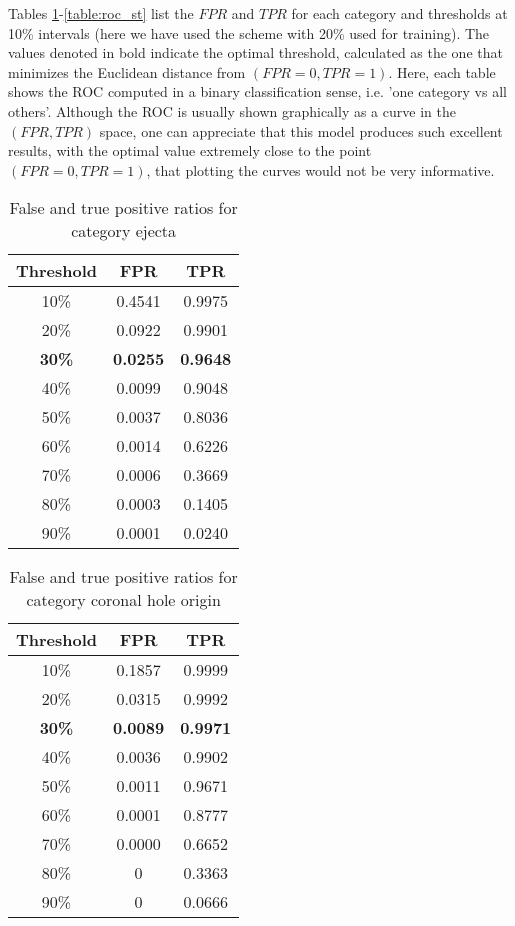 \documentclass[draft,jgrga]{agutex}
\begin{document}
\begin{article}
Tables \ref{table:roc_ejecta}-\ref{table:roc_st} list the $FPR$ and $TPR$ for each category and thresholds at 10\% intervals (here we have used the scheme with 20\% used for training). The values denoted in bold indicate the optimal threshold, calculated as the one that minimizes the Euclidean distance from $(FPR=0, TPR=1)$.
Here, each table shows the ROC computed in a binary classification sense, i.e. 'one category vs all others'.
Although the ROC is usually shown graphically as a curve in the $(FPR,TPR)$ space, one can appreciate that this model produces such excellent results, with the optimal value extremely close to the point $(FPR=0, TPR=1)$, that plotting the curves would not be very informative.
\begin{table}[!ht]
\caption{False and true positive ratios for category ejecta}\label{table:roc_ejecta}
\centering
\begin{tabular}{c c c}
\hline
Threshold & FPR & TPR\\
\hline
10\% &    0.4541 &   0.9975\\
20\% &    0.0922 &   0.9901\\
\bf{ 30}\% &    \bf{0.0255} &  \bf{ 0.9648}\\
40\% &   0.0099 &   0.9048\\
50\% &   0.0037 &   0.8036\\
60\% &   0.0014 &   0.6226\\
70\% &   0.0006 &   0.3669\\
80\% &   0.0003 &   0.1405\\
90\% &   0.0001 &   0.0240\\
\end{tabular}
\end{table}

\begin{table}[!ht]
\caption{False and true positive ratios for category coronal hole origin}\label{table:roc_ch}
\centering
\begin{tabular}{c c c}
\hline
Threshold & FPR & TPR\\
\hline
10\% &  0.1857 &   0.9999\\
20\% &    0.0315 &   0.9992\\
{\bf 30\%} & {\bf   0.0089} &  {\bf  0.9971}\\
40\% &    0.0036 &   0.9902\\
50\% &   0.0011  &  0.9671\\
60\% &    0.0001 &   0.8777\\
70\% &    0.0000 &   0.6652\\
80\% &        0  &  0.3363\\
90\% &         0  &  0.0666\\
\end{tabular}
\end{table}


\end{article}
\end{document}
